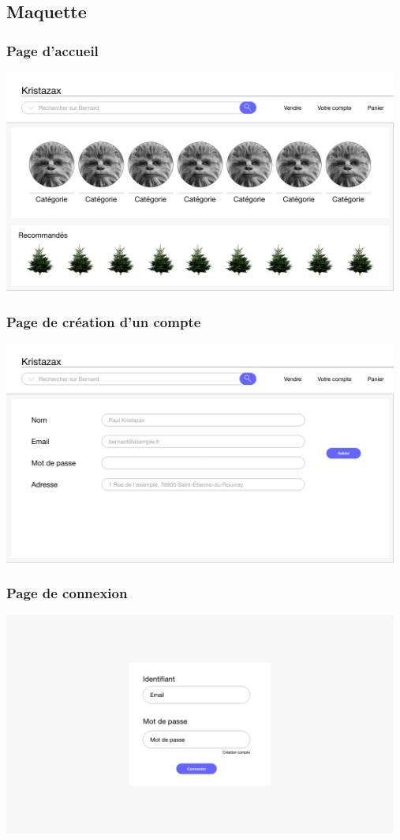 \subsection{Maquette}

\subsubsection{Page d'accueil}
\includegraphics[width=13cm]{Images/maquette/Accueil} \\
\subsubsection{Page de création d'un compte}
\includegraphics[width=13cm]{Images/maquette/CreationCompte} \\
\subsubsection{Page de connexion}
\includegraphics[width=13cm]{Images/maquette/Login} \\
